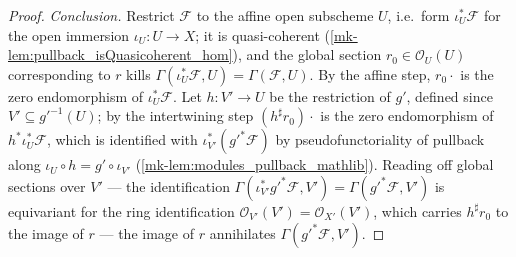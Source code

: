 \begin{proof}
  \emph{Conclusion.}  Restrict \(\mathcal{F}\) to the affine open subscheme
  \(U\), i.e.\ form \(\iota_U^* \mathcal{F}\) for the open immersion
  \(\iota_U : U \to X\); it is quasi-coherent
  (\ref{mk-lem:pullback_isQuasicoherent_hom}), and the global section
  \(r_0 \in \mathcal{O}_U(U)\) corresponding to \(r\) kills
  \(\Gamma(\iota_U^* \mathcal{F}, U) = \Gamma(\mathcal{F}, U)\).  By the
  affine step, \(r_0 \cdot\) is the zero endomorphism of
  \(\iota_U^* \mathcal{F}\).  Let \(h : V' \to U\) be the restriction of
  \(g'\), defined since \(V' \subseteq g'^{-1}(U)\); by the intertwining step
  \((h^\sharp r_0) \cdot\) is the zero endomorphism of
  \(h^* \iota_U^* \mathcal{F}\), which is identified with
  \(\iota_{V'}^* (g'^* \mathcal{F})\) by pseudofunctoriality of pullback
  along \(\iota_U \circ h = g' \circ \iota_{V'}\)
  (\ref{mk-lem:modules_pullback_mathlib}).  Reading off global sections over
  \(V'\) — the identification
  \(\Gamma(\iota_{V'}^* g'^* \mathcal{F}, V') = \Gamma(g'^* \mathcal{F}, V')\)
  is equivariant for the ring identification
  \(\mathcal{O}_{V'}(V') = \mathcal{O}_{X'}(V')\), which carries
  \(h^\sharp r_0\) to the image of \(r\) — the image of \(r\) annihilates
  \(\Gamma(g'^* \mathcal{F}, V')\).
\end{proof}

